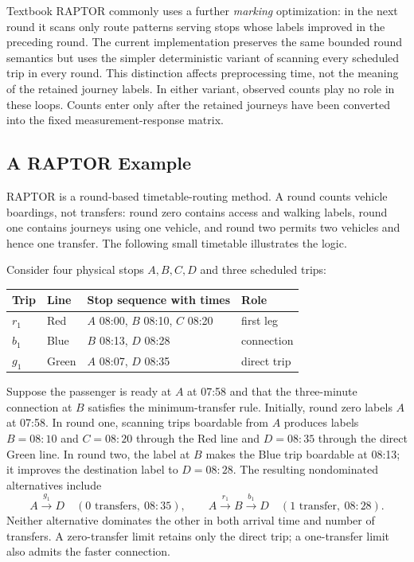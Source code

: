 Textbook RAPTOR commonly uses a further \emph{marking} optimization: in the
next round it scans only route patterns serving stops whose labels improved in
the preceding round.  The current implementation preserves the same bounded
round semantics but uses the simpler deterministic variant of scanning every
scheduled trip in every round.  This distinction affects preprocessing time,
not the meaning of the retained journey labels.  In either variant, observed
counts play no role in these loops.  Counts enter only after the retained
journeys have been converted into the fixed measurement-response matrix.

\subsection{A RAPTOR Example}
\label{sec:raptor-example}

RAPTOR is a round-based timetable-routing method.  A round counts vehicle
boardings, not transfers: round zero contains access and walking labels, round
one contains journeys using one vehicle, and round two permits two vehicles
and hence one transfer.  The following small timetable illustrates the logic.

Consider four physical stops $A,B,C,D$ and three scheduled trips:
\begin{center}
\begin{tabular}{llll}
\hline
Trip & Line & Stop sequence with times & Role \\
\hline
$r_1$ & Red   & $A$ 08:00, $B$ 08:10, $C$ 08:20 & first leg \\
$b_1$ & Blue  & $B$ 08:13, $D$ 08:28            & connection \\
$g_1$ & Green & $A$ 08:07, $D$ 08:35            & direct trip \\
\hline
\end{tabular}
\end{center}
Suppose the passenger is ready at $A$ at 07:58 and that the three-minute
connection at $B$ satisfies the minimum-transfer rule.  Initially, round zero
labels $A$ at 07:58.  In round one, scanning trips boardable from $A$ produces
labels $B=08{:}10$ and $C=08{:}20$ through the Red line and $D=08{:}35$
through the direct Green line.  In round two, the label at $B$ makes the Blue
trip boardable at 08:13; it improves the destination label to $D=08{:}28$.
The resulting nondominated alternatives include
\[
  A\xrightarrow{g_1}D
  \quad (0\text{ transfers},\ 08{:}35),
  \qquad
  A\xrightarrow{r_1}B\xrightarrow{b_1}D
  \quad (1\text{ transfer},\ 08{:}28).
\]
Neither alternative dominates the other in both arrival time and number of
transfers.  A zero-transfer limit retains only the direct trip; a one-transfer
limit also admits the faster connection.

